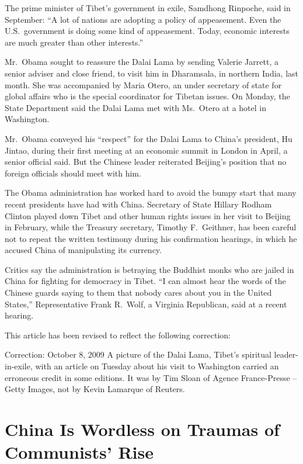 ﻿\documentclass[12pt]{article}
\begin{document}
The prime minister of Tibet's government in exile, Samdhong Rinpoche, said in September: ``A lot of
nations are adopting a policy of appeasement. Even the U.S.~government is doing some kind of
appeasement. Today, economic interests are much greater than other interests.''

Mr.~Obama sought to reassure the Dalai Lama by sending Valerie Jarrett, a senior adviser and close
friend, to visit him in Dharamsala, in northern India, last month. She was accompanied by Maria
Otero, an under secretary of state for global affairs who is the special coordinator for Tibetan
issues. On Monday, the State Department said the Dalai Lama met with Ms.~Otero at a hotel in
Washington.

Mr.~Obama conveyed his ``respect'' for the Dalai Lama to China's president, Hu Jintao, during their
first meeting at an economic summit in London in April, a senior official said. But the Chinese
leader reiterated Beijing's position that no foreign officials should meet with him.

The Obama administration has worked hard to avoid the bumpy start that many recent presidents have
had with China. Secretary of State Hillary Rodham Clinton played down Tibet and other human rights
issues in her visit to Beijing in February, while the Treasury secretary, Timothy F.~Geithner, has
been careful not to repeat the written testimony during his confirmation hearings, in which he
accused China of manipulating its currency.

Critics say the administration is betraying the Buddhist monks who are jailed in China for fighting
for democracy in Tibet. ``I can almost hear the words of the Chinese guards saying to them that
nobody cares about you in the United States,'' Representative Frank R.~Wolf, a Virginia Republican,
said at a recent hearing.

This article has been revised to reflect the following correction:

Correction: October 8, 2009 A picture of the Dalai Lama, Tibet's spiritual leader-in-exile, with an
article on Tuesday about his visit to Washington carried an erroneous credit in some editions. It
was by Tim Sloan of Agence France-Presse -- Getty Images, not by Kevin Lamarque of Reuters.

\section{China Is Wordless on Traumas\cite{trauma} of Communists' Rise}
\end{document}
